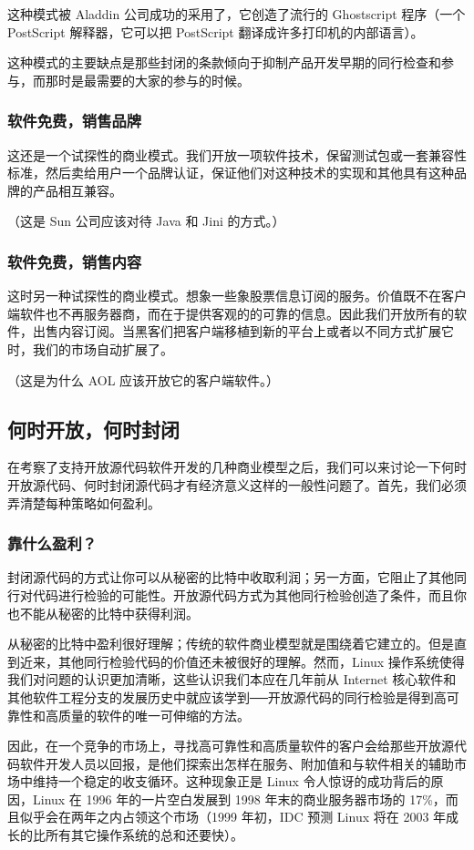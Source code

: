 这种模式被 Aladdin 公司成功的采用了，它创造了流行的 Ghostscript 程序（一个 PostScript 解释器，它可以把 PostScript 翻译成许多打印机的内部语言）。


这种模式的主要缺点是那些封闭的条款倾向于抑制产品开发早期的同行检查和参与，而那时是最需要的大家的参与的时候。

\subsubsection{软件免费，销售品牌}
这还是一个试探性的商业模式。我们开放一项软件技术，保留测试包或一套兼容性标准，然后卖给用户一个品牌认证，保证他们对这种技术的实现和其他具有这种品牌的产品相互兼容。


（这是 Sun 公司应该对待 Java 和 Jini 的方式。）

\subsubsection{软件免费，销售内容}
这时另一种试探性的商业模式。想象一些象股票信息订阅的服务。价值既不在客户端软件也不再服务器商，而在于提供客观的的可靠的信息。因此我们开放所有的软件，出售内容订阅。当黑客们把客户端移植到新的平台上或者以不同方式扩展它时，我们的市场自动扩展了。


（这是为什么 AOL 应该开放它的客户端软件。）


\subsection{何时开放，何时封闭}
在考察了支持开放源代码软件开发的几种商业模型之后，我们可以来讨论一下何时开放源代码、何时封闭源代码才有经济意义这样的一般性问题了。首先，我们必须弄清楚每种策略如何盈利。

\subsubsection{靠什么盈利？}
封闭源代码的方式让你可以从秘密的比特中收取利润；另一方面，它阻止了其他同行对代码进行检验的可能性。开放源代码方式为其他同行检验创造了条件，而且你也不能从秘密的比特中获得利润。


从秘密的比特中盈利很好理解；传统的软件商业模型就是围绕着它建立的。但是直到近来，其他同行检验代码的价值还未被很好的理解。然而，Linux 操作系统使得我们对问题的认识更加清晰，这些认识我们本应在几年前从 Internet 核心软件和其他软件工程分支的发展历史中就应该学到──开放源代码的同行检验是得到高可靠性和高质量的软件的唯一可伸缩的方法。


因此，在一个竞争的市场上，寻找高可靠性和高质量软件的客户会给那些开放源代码软件开发人员以回报，是他们探索出怎样在服务、附加值和与软件相关的辅助市场中维持一个稳定的收支循环。这种现象正是 Linux 令人惊讶的成功背后的原因，Linux 在 1996 年的一片空白发展到 1998 年末的商业服务器市场的 17\%，而且似乎会在两年之内占领这个市场（1999 年初，IDC 预测 Linux 将在 2003 年成长的比所有其它操作系统的总和还要快）。


